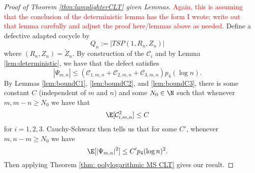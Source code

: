 \begin{proof}[Proof of Theorem \ref{thm:lamplighterCLT} given Lemmas]
   \textcolor{red}{Again, this
   is assuming that the conclusion
   of the deterministic lemma
   has the form I wrote;
   write out that lemma
   carefully and adjust the 
   proof here/lemmas above as 
   needed.}
   Define a defective adapted
   cocycle by
   \[
      Q_n := |TSP(1,R_n,Z_n)|
   \]
   where $(R_n,Z_n) = \tilde{Z}_n$.
   By construction of the $\mathcal{C}_i$ and by
   Lemma \ref{lem:deterministic},
   we have that the defect satisfies
   \[
      |\Psi_{m,n}| \le
      (\mathcal{C}_{1,m,n} +
      \mathcal{C}_{2,m,n} +
      \mathcal{C}_{3,m,n})p_4(\log n).
   \]
   By Lemmas \ref{lem:boundC1},
   \ref{lem:boundC2}, and \ref{lem:boundC3}, there 
   is some constant $C$ (independent
   of $m$ and $n$) and some $N_0 \in \N$ such that
   whenever $m, m-n \ge N_0$
   we have that
   \[
      \E[ \mathcal{C}_{i,m,n}^2] \le C
   \]
   for $i=1,2,3$. Cauchy-Schwarz
   then tells us that for some $C'$,
   whenever $m, n-m \ge N_0$ we 
   have
   \[
      \E[|\Psi_{m,n}|^2] \le C' p_4(\log n)^2.
   \]
   Then applying Theorem \ref{thm: polylogarithmic MS CLT} gives our result.
\end{proof}